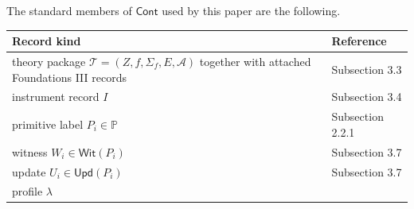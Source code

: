 \documentclass[11pt]{article}
\theoremstyle{definition}
\begin{document}
The standard members of \(\mathsf{Cont}\) used by this paper are the following.

\begin{longtable}[]{@{}ll@{}}
\toprule
\begin{minipage}[b]{0.47\columnwidth}\raggedright
Record kind\strut
\end{minipage} & \begin{minipage}[b]{0.47\columnwidth}\raggedright
Reference\strut
\end{minipage}\tabularnewline
\midrule
\endhead
\begin{minipage}[t]{0.47\columnwidth}\raggedright
theory package \(\mathcal T=(Z,f,\Sigma_f,E,\mathcal A)\) together with attached Foundations III records\strut
\end{minipage} & \begin{minipage}[t]{0.47\columnwidth}\raggedright
Subsection 3.3\strut
\end{minipage}\tabularnewline
\begin{minipage}[t]{0.47\columnwidth}\raggedright
instrument record \(I\)\strut
\end{minipage} & \begin{minipage}[t]{0.47\columnwidth}\raggedright
Subsection 3.4\strut
\end{minipage}\tabularnewline
\begin{minipage}[t]{0.47\columnwidth}\raggedright
primitive label \(P_i\in\mathbb P\)\strut
\end{minipage} & \begin{minipage}[t]{0.47\columnwidth}\raggedright
Subsection 2.2.1\strut
\end{minipage}\tabularnewline
\begin{minipage}[t]{0.47\columnwidth}\raggedright
witness \(W_i\in\mathsf{Wit}(P_i)\)\strut
\end{minipage} & \begin{minipage}[t]{0.47\columnwidth}\raggedright
Subsection 3.7\strut
\end{minipage}\tabularnewline
\begin{minipage}[t]{0.47\columnwidth}\raggedright
update \(U_i\in\mathsf{Upd}(P_i)\)\strut
\end{minipage} & \begin{minipage}[t]{0.47\columnwidth}\raggedright
Subsection 3.7\strut
\end{minipage}\tabularnewline
\begin{minipage}[t]{0.47\columnwidth}\raggedright
profile \(\lambda\)\strut
\end{minipage} & \begin{minipage}[t]{0.47\columnwidth}\raggedright

\end{minipage}
\end{longtable}
\end{document}
